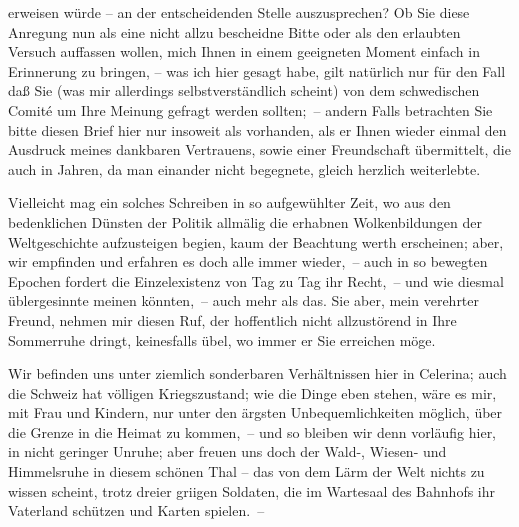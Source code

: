                erweisen würde – an der entscheidenden Stelle auszusprechen? Ob Sie \introOben{}\introOben{} diese Anregung nun als eine nicht allzu bescheidne Bitte oder als den
               erlaubten Versuch auffassen wollen, mich Ihnen in einem geeigneten Moment einfach in
               Erinnerung zu bringen, {\pb}– was ich hier gesagt
               habe, gilt natürlich nur für den Fall daß Sie (was mir allerdings selbstverständlich
               scheint) von dem schwedischen Comité um Ihre Meinung gefragt werden sollten; – andern
               Falls betrachten Sie bitte diesen Brief hier nur insoweit als vorhanden, als er Ihnen
               wieder einmal den Ausdruck meines dankbaren Vertrauens, sowie einer Freundschaft
               übermittelt, die auch in  Jahren, da man einander
               nicht begegnete, gleich herzlich weiterlebte.\pend
           
\pstart
           Vielleicht mag ein solches Schreiben in so aufgewühlter Zeit, wo aus den bedenklichen
               Dünsten der Politik allmälig die erhabnen Wolkenbildun{\pb}gen der Weltgeschichte aufzusteigen begi{\geminationn}en, kaum der Beachtung werth erscheinen; aber, wir
               empfinden und erfahren es doch alle immer wieder, – auch in so bewegten Epochen
               fordert die Einzelexistenz von Tag zu Tag ihr Recht, – und wie diesmal üblergesinnte
               meinen könnten, – auch mehr als das. Sie aber, mein verehrter Freund, nehmen mir
               diesen Ruf, der hoffentlich nicht allzustörend in Ihre Sommerruhe dringt, keinesfalls
               übel, wo immer er Sie erreichen möge.\pend
           
\pstart
           Wir befinden uns unter ziemlich sonderbaren Verhältnissen hier in Celerina; auch die Schweiz
               hat völligen Kriegszustand; wie die Dinge eben stehen, wäre es mir, mit Frau und Kindern, nur unter den ärgsten {\pb}Unbequemlichkeiten möglich, über die Grenze in die
               Heimat zu kommen, – und so bleiben wir denn vorläufig \introOben{}hier\introOben{},
               in nicht geringer Unruhe; aber freuen uns doch der Wald-, Wiesen- und Himmelsruhe in
               diesem schönen Thal – das von dem Lärm der Welt nichts zu wissen scheint, trotz
               dreier gri{\geminationm}igen Soldaten, die im Wartesaal des Bahnhofs
               ihr Vaterland schützen und Karten spielen. –\pend
           
